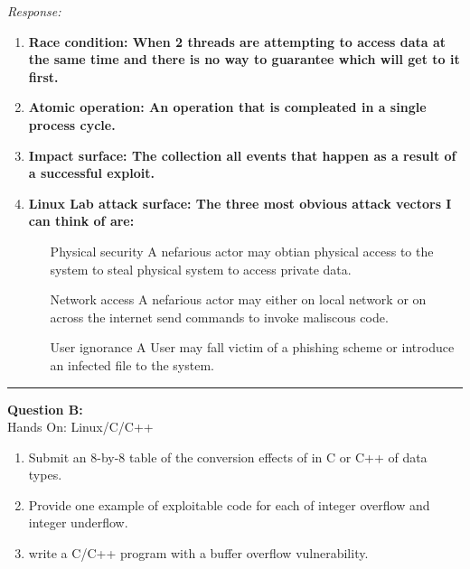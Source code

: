 \documentclass[a4paper, 11pt]{article}
\newenvironment{problem}[2][Question]
               { \begin{mdframed}[backgroundcolor=gray!20] \textbf{#1 #2:} \\}
               {   \end{mdframed}}
\newenvironment{response}
                {\textit{Response:}}
                {}
\begin{document}
 \begin{response}
   \begin{enumerate}[label=\arabic*.]
   \item
     \bf{Race condition}: When 2 threads are attempting to access data at the same time and there is no way to guarantee which will get to it first.
   \item
     \bf{Atomic operation}: An operation that is compleated in a single process cycle.
   \item
     \bf{Impact surface}: The collection all events that happen as a result of a successful exploit.
   \item
     \bf{Linux Lab attack surface}: The three most obvious attack vectors I can think of are:
     \begin{itemize}[leftmargin=100pt]
     \item[Physical security]
       A nefarious actor may obtian physical access to the system to steal physical system to access private data.
     \item[Network access]
       A nefarious actor may either on local network or on across the internet send commands to invoke maliscous code.
     \item[User ignorance]
       A User may fall victim of a phishing scheme or introduce an infected file to the system.
     \end{itemize}  
   \end{enumerate}      
 \end{response}
 \noindent\rule{7in}{2.8pt}
\newpage
 \begin{problem}{B} 
   Hands On: Linux/C/C++\\

   \begin{enumerate}[label=\arabic*.]
   \item
     Submit an 8-by-8 table of the conversion effects of in C or C++ of data types.
   \item
     Provide one example of exploitable code for each of integer overflow and integer underflow. 
   \item
     write a C/C++ program with a buffer overflow vulnerability.
      
  \end{enumerate}
\end{problem}
\end{document}
